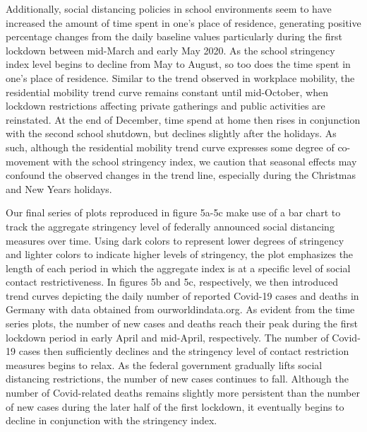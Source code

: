 Additionally, social distancing policies in school environments seem to have increased the amount of time spent in one’s place of residence, generating positive percentage changes from the daily baseline values particularly during the first lockdown between mid-March and early May 2020. As the school stringency index level begins to decline from May to August, so too does the time spent in one’s place of residence. Similar to the trend observed in workplace mobility, the residential mobility trend curve remains constant until mid-October, when lockdown restrictions affecting private gatherings and public activities are reinstated. At the end of December, time spend at home then rises in conjunction with the second school shutdown, but declines slightly after the holidays. As such, although the residential mobility trend curve expresses some degree of co-movement with the school stringency index, we caution that seasonal effects may confound the observed changes in the trend line, especially during the Christmas and New Years holidays. 

Our final series of plots reproduced in figure 5a-5c make use of a bar chart to track the aggregate stringency level of federally announced social distancing measures over time. Using dark colors to represent lower degrees of stringency and lighter colors to indicate higher levels of stringency, the plot emphasizes the length of each period in which the aggregate index is at a specific level of social contact restrictiveness. In figures 5b and 5c, respectively, we then introduced trend curves depicting the daily number of reported Covid-19 cases and deaths in Germany with data obtained from ourworldindata.org. As evident from the time series plots, the number of new cases and deaths reach their peak during the first lockdown period in early April and mid-April, respectively. The number of Covid-19 cases then sufficiently declines and the stringency level of contact restriction measures begins to relax. As the federal government gradually lifts social distancing restrictions, the number of new cases continues to fall. Although the number of Covid-related deaths remains slightly more persistent than the number of new cases during the later half of the first lockdown, it eventually begins to decline in conjunction with the stringency index. 

